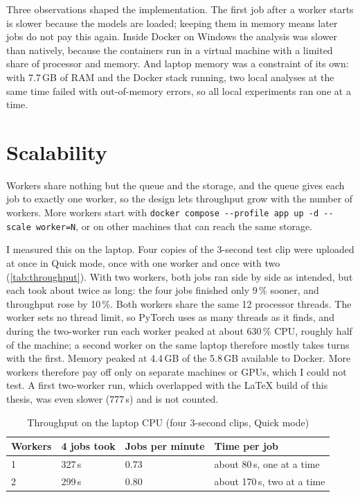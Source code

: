 Three observations shaped the implementation. The first job after a worker starts is slower because the models are loaded; keeping them in memory means later jobs do not pay this again. Inside Docker on Windows the analysis was slower than natively, because the containers run in a virtual machine with a limited share of processor and memory. And laptop memory was a constraint of its own: with 7.7\,GB of RAM and the Docker stack running, two local analyses at the same time failed with out-of-memory errors, so all local experiments ran one at a time.

\section{Scalability}

Workers share nothing but the queue and the storage, and the queue gives each job to exactly one worker, so the design lets throughput grow with the number of workers. More workers start with \texttt{docker compose -{}-profile app up -d -{}-scale worker=N}, or on other machines that can reach the same storage.

I measured this on the laptop. Four copies of the 3-second test clip were uploaded at once in Quick mode, once with one worker and once with two (\autoref{tab:throughput}). With two workers, both jobs ran side by side as intended, but each took about twice as long: the four jobs finished only 9\,\% sooner, and throughput rose by 10\,\%. Both workers share the same 12 processor threads. The worker sets no thread limit, so PyTorch uses as many threads as it finds, and during the two-worker run each worker peaked at about 630\,\% CPU, roughly half of the machine; a second worker on the same laptop therefore mostly takes turns with the first. Memory peaked at 4.4\,GB of the 5.8\,GB available to Docker. More workers therefore pay off only on separate machines or GPUs, which I could not test. A first two-worker run, which overlapped with the LaTeX build of this thesis, was even slower (777\,s) and is not counted.

\begin{table}[H]
	\centering
	\begin{tabular}{|p{}|p{}|p{}|p{}|}
		\hline
		\textbf{Workers} & \textbf{4 jobs took} & \textbf{Jobs per minute} & \textbf{Time per job} \\
		\hline
		1 & 327\,s & 0.73 & about 80\,s, one at a time \\
		\hline
		2 & 299\,s & 0.80 & about 170\,s, two at a time \\
		\hline
	\end{tabular}
	\caption{Throughput on the laptop CPU (four 3-second clips, Quick mode)}
	\label{tab:throughput}
\end{table}

